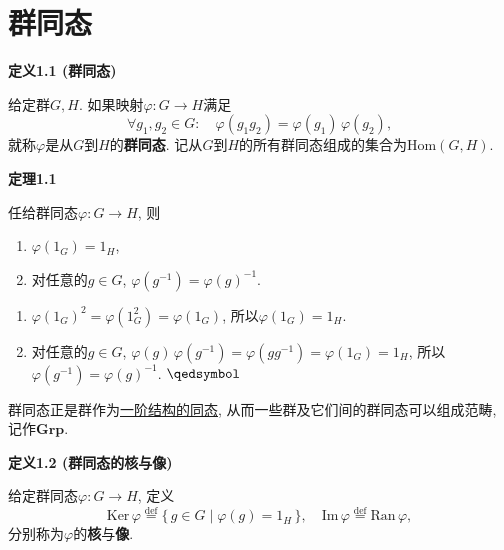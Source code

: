 \documentclass[UTF8]{ctexart}
\begin{document}
\setlength{\abovedisplayskip}{1pt}
\setlength{\belowdisplayskip}{1pt}

\section{群同态}

\hypertarget{sec:定义1.1}{}
\noindent\textbf{定义1.1 (群同态)}

给定群$G,H$. 如果映射$\varphi:G\to H$满足
\[
    \forall g_1,g_2\in G:\quad\varphi(g_1g_2)=\varphi(g_1)\,\varphi(g_2),
\]
就称$\varphi$是从$G$到$H$的\textbf{群同态}.
记从$G$到$H$的所有群同态组成的集合为$\mathrm{Hom}(G,H)$.

\vspace{10pt}

\hypertarget{sec:定理1.1}{}
\noindent\textbf{定理1.1}

任给群同态$\varphi:G\to H$, 则
\begin{enumerate}
    \item $\varphi(1_G)=1_H$,
    \item 对任意的$g\in G$, $\varphi(g^{-1})=\varphi(g)^{-1}$.
\end{enumerate}


\begin{enumerate}
    \item $\varphi(1_G)^2=\varphi(1_G^2)=\varphi(1_G)$, 所以$\varphi(1_G)=1_H$.
    \item 对任意的$g\in G$, $\varphi(g)\,\varphi(g^{-1})=\varphi(gg^{-1})
    =\varphi(1_G)=1_H$, 所以$\varphi(g^{-1})=\varphi(g)^{-1}$. \hfill $\qedsymbol$
\end{enumerate}

\vspace{10pt}

群同态正是群作为\href{../../../05 数理逻辑/02 模型论/01 一阶语言的结构/02 结构的同态#nameddest=sec:定义1.1}
{一阶结构的同态}, 从而一些群及它们间的群同态可以组成范畴, 记作$\mathbf{Grp}$.

\vspace{10pt}

\hypertarget{sec:定义1.2}{}
\noindent\textbf{定义1.2 (群同态的核与像)}

给定群同态$\varphi:G\to H$, 定义
\[
    \mathrm{Ker}\,\varphi\overset{\mathrm{def}}{=}\{\,g\in G\mid\varphi(g)=1_H\,\},
    \quad\mathrm{Im}\,\varphi\overset{\mathrm{def}}{=}\mathrm{Ran}\,\varphi,
\]
分别称为$\varphi$的\textbf{核}与\textbf{像}.

\vspace{10pt}
\end{document}
